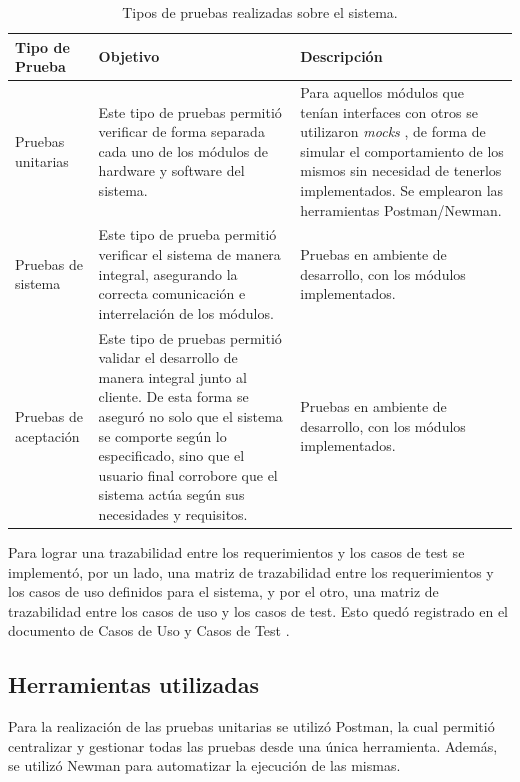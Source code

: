\begin{table}[h]
	\centering
	\caption[Tipos de pruebas realizadas sobre el sistema]{Tipos de pruebas realizadas sobre el sistema.}
	\begin{tabular}{p{3.0cm} p{5.5cm} p{4.0cm}} 	

		\toprule
		\textbf{Tipo de Prueba} & 
		\textbf{Objetivo } & 
		\textbf{Descripción} 
		\\
		\midrule
Pruebas unitarias  &
Este tipo de pruebas permitió verificar de forma separada cada uno de los módulos de hardware y software del sistema. 		
		   & Para aquellos módulos que tenían interfaces con otros  se utilizaron \textit{mocks} \citep{WEBSITE:Mocks}, de forma de simular el comportamiento de los mismos sin necesidad de tenerlos implementados. Se emplearon las herramientas Postman/Newman. \\	
Pruebas de sistema &
Este tipo de prueba permitió verificar el sistema de manera integral, asegurando la correcta comunicación e interrelación de los módulos. &
Pruebas en ambiente de desarrollo, con los módulos implementados. \\		Pruebas de aceptación &
Este tipo de pruebas permitió validar el desarrollo de manera integral junto al cliente. De esta forma se aseguró no solo que el sistema se comporte según lo especificado, sino que el usuario final corrobore que el sistema actúa según sus necesidades y requisitos. &
Pruebas en ambiente de desarrollo, con los módulos implementados.	\\   
		   
		   	
		\bottomrule
		\hline
	\end{tabular}
	\label{tab:tablaTiposPruebas}
\end{table}

Para lograr una trazabilidad entre los requerimientos y los casos de test se implementó, por un lado, una matriz de trazabilidad entre los requerimientos y los casos de uso definidos para el sistema, y por el otro, una matriz de trazabilidad entre los casos de uso y los casos de test. Esto quedó registrado en el documento de Casos de Uso y Casos de Test \citep{WEBSITE:CasosUsoYTest}.

\pagebreak
\subsection{Herramientas utilizadas}

Para la realización de las pruebas unitarias se utilizó Postman, la cual permitió centralizar y gestionar todas las pruebas desde una única herramienta. Además, se utilizó Newman para automatizar la ejecución de las mismas.

